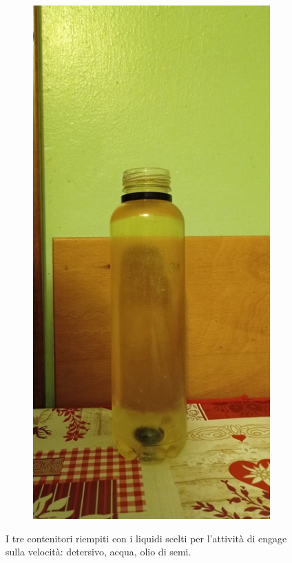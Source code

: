 \documentclass{report} \usepackage[T1]{fontenc} \usepackage[italian]{babel}
\begin{document}
\begin{figure}[H]
\begin{subfigure}[b]{0.3\textwidth}
  \end{subfigure}
  \begin{subfigure}[b]{0.3\textwidth}
  \includegraphics[width=\textwidth]{olio}
  \end{subfigure}
  \caption{
           I tre contenitori riempiti con i liquidi
           scelti per l'attività di engage sulla
           velocità: detersivo, acqua, olio di semi.
          }
  \label{fig:liquids}
\end{figure}
\end{document}
